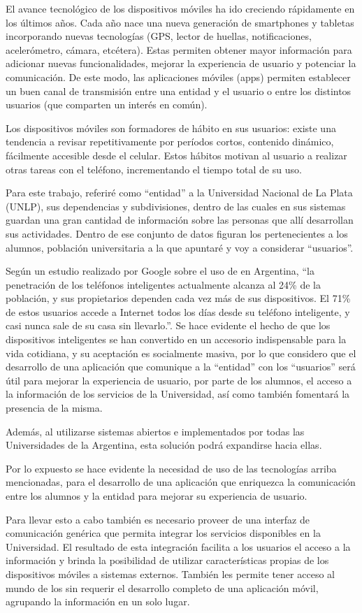 El avance tecnológico de los dispositivos móviles ha ido creciendo rápidamente
en los últimos años. Cada año nace una nueva generación de smartphones y
tabletas incorporando nuevas tecnologías (GPS, lector de huellas,
notificaciones, acelerómetro, cámara, etcétera). Estas permiten obtener mayor
información para adicionar nuevas funcionalidades, mejorar la experiencia de
usuario y potenciar la comunicación. De este modo, las aplicaciones móviles
(apps) permiten establecer un buen canal de transmisión entre una entidad y el
usuario o entre los distintos usuarios (que comparten un interés en común).

Los dispositivos móviles son formadores de hábito en sus usuarios: existe una tendencia a revisar repetitivamente por períodos cortos, contenido dinámico, fácilmente accesible desde el celular\cite{oulasvirta2012habits}.
Estos hábitos motivan al usuario a realizar otras tareas con el teléfono, incrementando el tiempo total de su uso.

Para este trabajo, referiré como “entidad” a la Universidad Nacional de La Plata
(UNLP), sus dependencias y subdivisiones, dentro de las cuales en sus sistemas guardan una gran cantidad
de información sobre las personas que allí desarrollan sus actividades. Dentro
de ese conjunto de datos figuran los pertenecientes a los alumnos, población
universitaria a la que apuntaré y voy a considerar “usuarios”.

Según un estudio realizado por Google sobre el uso de 
en Argentina, \cite{GoogleEstudioSmartphones} ``la penetración de los teléfonos
inteligentes actualmente alcanza al 24\% de la población, y sus propietarios
dependen cada vez más de sus dispositivos. El 71\% de estos usuarios accede a
Internet todos los días desde su teléfono inteligente, y casi nunca sale de su
casa sin llevarlo.''. Se hace evidente el hecho de que los dispositivos
inteligentes se han convertido en un accesorio indispensable para la vida
cotidiana, y su aceptación es socialmente masiva, por lo que considero que el
desarrollo de una aplicación que comunique a la “entidad” con los “usuarios”
será útil para mejorar la experiencia de usuario, por parte de los alumnos, el
acceso a la información de los servicios de la Universidad, así como también
fomentará la presencia de la misma.

Además, al utilizarse sistemas abiertos e implementados por todas las
Universidades de la Argentina, esta solución podrá expandirse hacia ellas.

Por lo expuesto se hace evidente la necesidad de uso de
las tecnologías arriba mencionadas, para el desarrollo de una aplicación que
enriquezca la comunicación entre los alumnos y la entidad para mejorar su
experiencia de usuario.

Para llevar esto a cabo también es necesario proveer de una interfaz de comunicación genérica que permita integrar los servicios disponibles en la Universidad. El resultado de esta integración facilita a los usuarios el acceso a la información y brinda la posibilidad de utilizar características propias de los dispositivos móviles a sistemas externos. También les permite tener acceso al mundo de los  sin requerir el desarrollo completo de una aplicación móvil, agrupando la información en un solo lugar.

